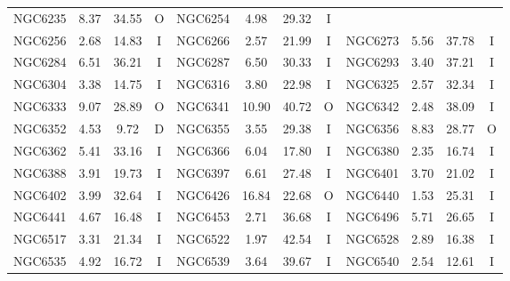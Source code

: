 \begin{table}
\begin{tabular}{l | c | c | c | l | c | c | c | l | c | c | c}
                NGC6235 &   8.37 &  34.55 &              O &
                NGC6254 &   4.98 &  29.32 &              I \\
                NGC6256 &   2.68 &  14.83 &              I &
                NGC6266 &   2.57 &  21.99 &              I &
                NGC6273 &   5.56 &  37.78 &              I \\
                NGC6284 &   6.51 &  36.21 &              I &
                NGC6287 &   6.50 &  30.33 &              I &
                NGC6293 &   3.40 &  37.21 &              I \\
                NGC6304 &   3.38 &  14.75 &              I &
                NGC6316 &   3.80 &  22.98 &              I &
                NGC6325 &   2.57 &  32.34 &              I \\
                NGC6333 &   9.07 &  28.89 &              O &
                NGC6341 &  10.90 &  40.72 &              O &
                NGC6342 &   2.48 &  38.09 &              I \\
                NGC6352 &   4.53 &   9.72 &              D &
                NGC6355 &   3.55 &  29.38 &              I &
                NGC6356 &   8.83 &  28.77 &              O \\
                NGC6362 &   5.41 &  33.16 &              I &
                NGC6366 &   6.04 &  17.80 &              I &
                NGC6380 &   2.35 &  16.74 &              I \\
                NGC6388 &   3.91 &  19.73 &              I &
                NGC6397 &   6.61 &  27.48 &              I &
                NGC6401 &   3.70 &  21.02 &              I \\
                NGC6402 &   3.99 &  32.64 &              I &
                NGC6426 &  16.84 &  22.68 &              O &
                NGC6440 &   1.53 &  25.31 &              I \\
                NGC6441 &   4.67 &  16.48 &              I &
                NGC6453 &   2.71 &  36.68 &              I &
                NGC6496 &   5.71 &  26.65 &              I \\
                NGC6517 &   3.31 &  21.34 &              I &
                NGC6522 &   1.97 &  42.54 &              I &
                NGC6528 &   2.89 &  16.38 &              I \\
                NGC6535 &   4.92 &  16.72 &              I &
                NGC6539 &   3.64 &  39.67 &              I &
                NGC6540 &   2.54 &  12.61 &              I \\

\end{tabular}
\end{table}
